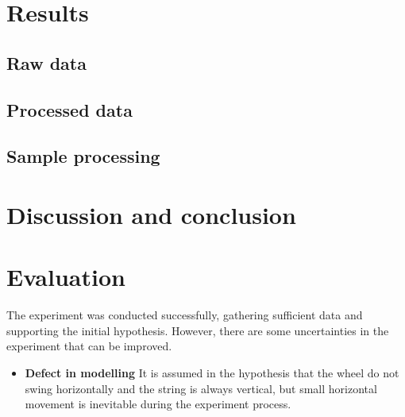 \documentclass[a4paper]{article}
\begin{document}
\section{Results}

\subsection{Raw data}

\subsection{Processed data}

\subsection{Sample processing}

\section{Discussion and conclusion}

\section{Evaluation}

The experiment was conducted successfully, gathering sufficient data and supporting the initial hypothesis. However, there are some uncertainties in the experiment that can be improved. 

\begin{itemize}
    \item \textbf{Defect in modelling} It is assumed in the hypothesis that the wheel do not swing horizontally and the string is always vertical, but small horizontal movement is inevitable during the experiment process.
\end{itemize}
\end{document}

